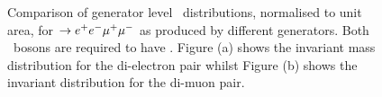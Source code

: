 \begin{figure}
\centering
        \vspace{-5mm}
        \vspace{-2mm}
    \caption[Comparison of generator level \mZ\ distributions, normalised to
    unit area, for \qqZZ $\ra\eemm$ as produced by different generators.]{\small
    Comparison of generator level \mZ\ distributions, normalised to
    unit area, for \qqZZ $\ra\eemm$ as produced by different generators. Both 
    \Z\ bosons
    are required to have \sstooos. Figure (a)
    shows the invariant mass distribution for the di-electron pair whilst Figure 
    (b) shows the invariant distribution for the di-muon pair.
    } 
    
    \label{fig:gen-comp-mZ} 
    \end{figure}

